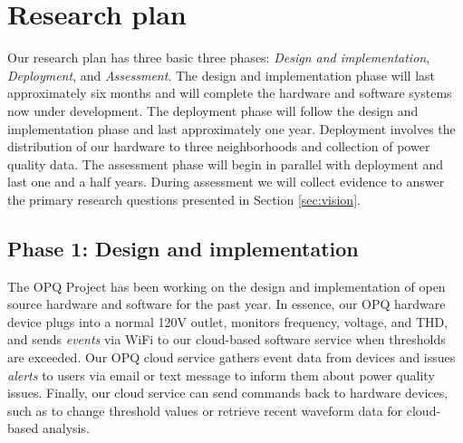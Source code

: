 
\section{Research plan}


Our research plan has three basic three phases: {\em Design and implementation}, {\em Deployment}, and {\em Assessment}.  The design and implementation phase will last approximately six months and will complete the hardware and software systems now under development. The deployment phase will follow the design and implementation phase and last approximately one year. Deployment involves the distribution of our hardware to three neighborhoods and collection of power quality data.  The assessment phase will begin in parallel with deployment and last one and a half years. During assessment we will collect evidence to answer the primary research questions presented in Section \ref{sec:vision}.

\subsection{Phase 1: Design and implementation}

The OPQ Project has been working on the design and implementation of open source hardware and software for the past year. In essence, our OPQ hardware device plugs into a normal 120V outlet, monitors frequency, voltage, and THD, and sends {\em events} via WiFi to our cloud-based software service when thresholds are exceeded.  Our OPQ cloud service gathers event data from devices and issues {\em alerts} to users via email or text message to inform them about power quality issues. Finally, our cloud service can send commands back to hardware devices, such as to change threshold values or retrieve recent waveform data for cloud-based analysis.

